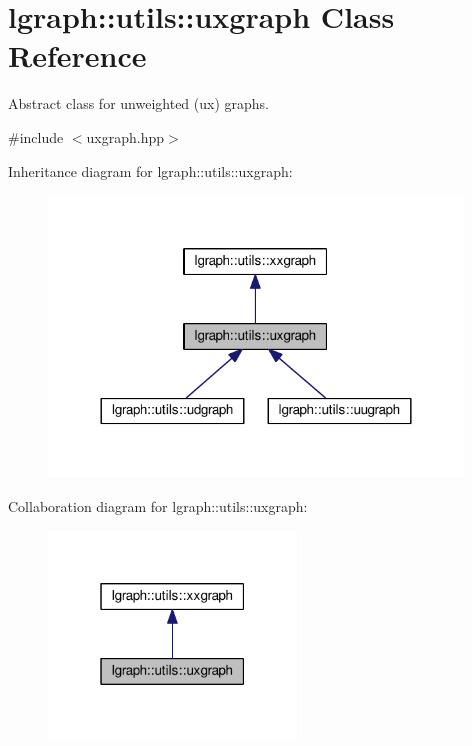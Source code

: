 \hypertarget{classlgraph_1_1utils_1_1uxgraph}{}\section{lgraph\+:\+:utils\+:\+:uxgraph Class Reference}
\label{classlgraph_1_1utils_1_1uxgraph}


Abstract class for unweighted (ux) graphs.  




{\ttfamily \#include $<$uxgraph.\+hpp$>$}



Inheritance diagram for lgraph\+:\+:utils\+:\+:uxgraph\+:\nopagebreak
\begin{figure}[H]
\begin{center}
\leavevmode
\includegraphics[width=312pt]{classlgraph_1_1utils_1_1uxgraph__inherit__graph}
\end{center}
\end{figure}


Collaboration diagram for lgraph\+:\+:utils\+:\+:uxgraph\+:\nopagebreak
\begin{figure}[H]
\begin{center}
\leavevmode
\includegraphics[width=187pt]{classlgraph_1_1utils_1_1uxgraph__coll__graph}
\end{center}
\end{figure}

